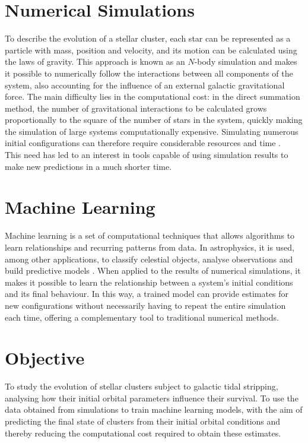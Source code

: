 \section{Numerical Simulations}
\label{sec:simulazioni-numeriche}
To describe the evolution of a stellar cluster, each star can be represented as a particle with mass, position and velocity, and its motion can be calculated using the laws of gravity. This approach is known as an $N$-body simulation and makes it possible to numerically follow the interactions between all components of the system, also accounting for the influence of an external galactic gravitational force.
The main difficulty lies in the computational cost: in the direct summation method, the number of gravitational interactions to be calculated grows proportionally to the square of the number of stars in the system, quickly making the simulation of large systems computationally expensive. Simulating numerous initial configurations can therefore require considerable resources and time \cite{spurzem2023}.\\ This need has led to an interest in tools capable of using simulation results to make new predictions in a much shorter time.
\section{Machine Learning}
\label{sec:apprendimento-automatico}
Machine learning is a set of computational techniques that allows algorithms to learn relationships and recurring patterns from data. In astrophysics, it is used, among other applications, to classify celestial objects, analyse observations and build predictive models \cite{rodriguez2022}.
When applied to the results of numerical simulations, it makes it possible to learn the relationship between a system's initial conditions and its final behaviour. In this way, a trained model can provide estimates for new configurations without necessarily having to repeat the entire simulation each time, offering a complementary tool to traditional numerical methods.
\section{Objective}
\label{sec:obiettivo}
To study the evolution of stellar clusters subject to galactic tidal stripping, analysing how their initial orbital parameters influence their survival. To use the data obtained from simulations to train machine learning models, with the aim of predicting the final state of clusters from their initial orbital conditions and thereby reducing the computational cost required to obtain these estimates.%
